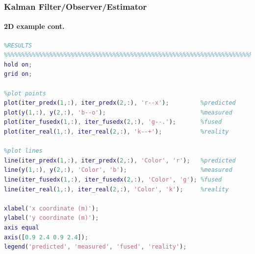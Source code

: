 \begin{frame}[fragile]\pw\Large
\frametitle{Kalman Filter/Observer/Estimator}
\framesubtitle{2D example \tiny cont.}

\tinyvvv \begin{lstlisting}[language=Matlab]
%%%%%%%%%%%%%%%%%%%%%%%%%%%%%%%%%%%%%%%%%%%%%%%%%%%%%%%%%%%%%%%%%%%%%%%%%%%%%%%%%%%%%%%%%
%RESULTS
%%%%%%%%%%%%%%%%%%%%%%%%%%%%%%%%%%%%%%%%%%%%%%%%%%%%%%%%%%%%%%%%%%%%%%%%%%%%%%%%%%%%%%%%%
hold on;
grid on;

%plot points
plot(iter_predx(1,:), iter_predx(2,:), 'r--x');         %predicted
plot(y(1,:), y(2,:), 'b--o');                           %measured
plot(iter_fusedx(1,:), iter_fusedx(2,:), 'g--.');       %fused
plot(iter_real(1,:), iter_real(2,:), 'k--+');           %reality

%plot lines
line(iter_predx(1,:), iter_predx(2,:), 'Color', 'r');   %predicted
line(y(1,:), y(2,:), 'Color', 'b');                     %measured
line(iter_fusedx(1,:), iter_fusedx(2,:), 'Color', 'g'); %fused
line(iter_real(1,:), iter_real(2,:), 'Color', 'k');     %reality

xlabel('x coordinate (m)');
ylabel('y coordinate (m)');
axis equal
axis([0.9 2.4 0.9 2.4]);
legend('predicted', 'measured', 'fused', 'reality');
\end{lstlisting}
\end{frame}



